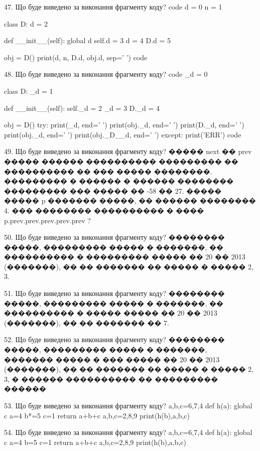 \documentclass[11pt]{article}
\begin{document}
47. Що буде виведено за виконання фрагменту коду?
code
d = 0
n = 1

class D:
    d = 2
    
    def __init__(self):
global d        self.d = 3
        d = 4
        D.d = 5

obj = D()
print(d, n, D.d, obj.d, sep=' ')
code


48. Що буде виведено за виконання фрагменту коду?
code
_d = 0

class D:
    _d = 1
    
    def __init__(self):
        self._d = 2
        _d = 3
        D._d = 4

obj = D()
try:
    print(_d, end=' ')
    print(obj._d, end=' ')
    print(D._d, end=' ')
    print(obj._d, end=' ')
    print(obj._D__d, end=' ')
except:
    print('ERR')
code


49. Що буде виведено за виконання фрагменту коду?
����� next �� prev ����� ������ ���������� ��������� �� ���������� �� ��� ����� ��������. ��������� � ������ � ������ �������� ��������� ��� ����� �� -58 �� 27. ����� ����� p ������� �����, �� ������ �������� 4.
��� �������� ���������� � ���� p.prev.prev.prev.prev.prev ?

50. Що буде виведено за виконання фрагменту коду?
�������� �����, ��������� ����� � �������, �� ���������� � ��������� ����� �� 20 �� 2013 (�������), �� �� ������� �� ����� � ����� 2, 3.

51. Що буде виведено за виконання фрагменту коду?
�������� �����, ��������� ����� � �������, �� ���������� � ����� ����� �� 20 �� 2013 (�������), �� �� ������� �� 7.

52. Що буде виведено за виконання фрагменту коду?
�������� �����, ��������� ����� � �������, ������� ����� � ��� ����� �� 20 �� 2013 (�������), �� �� ������� �� ����� � ����� 2, 3, � ������ ���������� �� ��������� ������ 

53. Що буде виведено за виконання фрагменту коду?
a,b,c=6,7,4
   def h(a):
     global c     a=4
     b*=5
     c=1
     return a+b+c
   a,b,c=2,8,9
   print(h(b),a,b,c)

54. Що буде виведено за виконання фрагменту коду?
a,b,c=6,7,4
   def h(a):
     global c     a=4
     b=5
     c=1
     return a+b+c
   a,b,c=2,8,9
   print(h(b),a,b,c)
\end{document}
